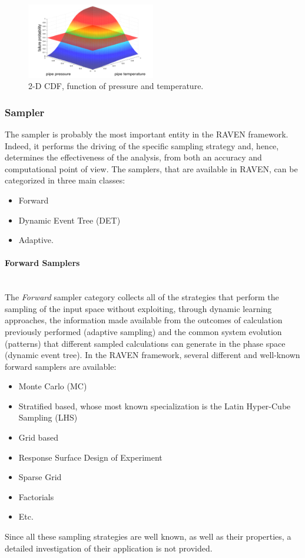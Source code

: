 \begin{figure}
  \centering
  \includegraphics[width=0.5\textwidth]  {pics/NDimensionalDistributionExample.png}
  \caption{2-D CDF, function of pressure and temperature.}
  \label{fig:NDDistributionExample}
\end{figure}

\subsubsection{Sampler}

The sampler is probably the most important entity in the RAVEN framework. Indeed, it performs the driving of the specific sampling strategy and, hence, determines the effectiveness of the analysis, from both an accuracy and computational point of view.  The samplers, that are available in RAVEN, can be categorized in three main classes:
\begin{itemize}
 \item Forward
 \item Dynamic Event Tree (DET)
 \item Adaptive.
\end{itemize}
\paragraph{Forward Samplers} ~\\ 
The \textit{Forward} sampler category collects all of the strategies that perform the sampling of the input space without exploiting, through dynamic learning approaches, the information made available from the outcomes of calculation previously performed (adaptive sampling) and the common system evolution (patterns) that different sampled calculations can generate in the phase space (dynamic event tree). 
In the RAVEN framework, several different and well-known forward samplers are available:
\begin{itemize}
\item Monte Carlo (MC)
\item Stratified based, whose most known specialization is the Latin Hyper-Cube Sampling (LHS)
\item Grid based
\item Response Surface Design of Experiment
\item Sparse Grid
\item Factorials
\item Etc.
\end{itemize}
Since all these sampling strategies are well known, as well as their properties, a detailed investigation of their application is not provided.
